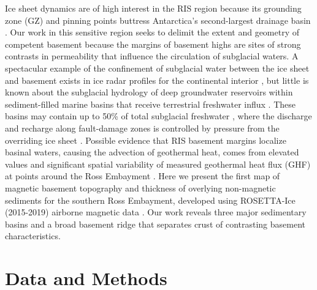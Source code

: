 Ice sheet dynamics are of high interest in the RIS region because its grounding zone (GZ) and pinning points \citep{stillmechanical2019} buttress Antarctica's second-largest drainage basin \citep{tintoross2019}. Our work in this sensitive region seeks to delimit the extent and geometry of competent basement because the margins of basement highs are sites of strong contrasts in permeability that influence the circulation of subglacial waters. A spectacular example of the confinement of subglacial water between the ice sheet and basement exists in ice radar profiles for the continental interior \citep{bellwidespread2011}, but little is known about the subglacial hydrology of deep groundwater reservoirs within sediment-filled marine basins that receive terrestrial freshwater influx \citep{siegertantarctic2018, gustafsondynamic2022}. These basins may contain up to 50\% of total subglacial freshwater \citep{christoffersensignificant2014}, where the discharge and recharge along fault-damage zones \citep{joliegeological2021} is controlled by pressure from the overriding ice sheet \citep{goochpotential2016}. Possible evidence that RIS basement margins localize basinal waters, causing the advection of geothermal heat, comes from elevated values and significant spatial variability of measured geothermal heat flux (GHF) at points around the Ross Embayment \citep{begemanspatially2017}. Here we present the first map of magnetic basement topography and thickness of overlying non-magnetic sediments for the southern Ross Embayment, developed using ROSETTA-Ice (2015-2019) airborne magnetic data \citep[Figure \ref{fig:chp2_Bathy_Mag}b,][]{tintoross2019}. Our work reveals three major sedimentary basins and a broad basement ridge that separates crust of contrasting basement characteristics.

\section{Data and Methods} \label{chp2:data_and_methods}

